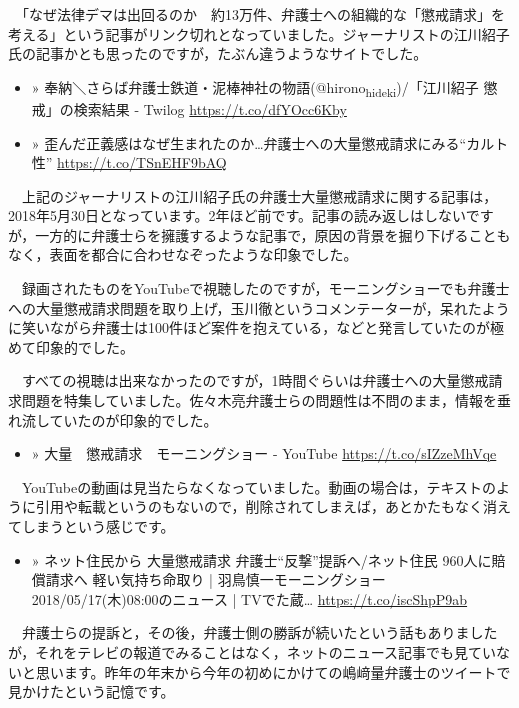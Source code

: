\documentclass[]{ltjarticle}
\begin{document}
　「なぜ法律デマは出回るのか　約13万件、弁護士への組織的な「懲戒請求」を考える」という記事がリンク切れとなっていました。ジャーナリストの江川紹子氏の記事かとも思ったのですが，たぶん違うようなサイトでした。

\begin{itemize}
\item » 奉納＼さらば弁護士鉄道・泥棒神社の物語(@hirono\textsubscript{hideki})/「江川紹子 懲戒」の検索結果 - Twilog \url{https://t.co/dfYOcc6Kby}

\item » 歪んだ正義感はなぜ生まれたのか…弁護士への大量懲戒請求にみる“カルト性” \url{https://t.co/TSnEHF9bAQ}
\end{itemize}

　上記のジャーナリストの江川紹子氏の弁護士大量懲戒請求に関する記事は，2018年5月30日となっています。2年ほど前です。記事の読み返しはしないですが，一方的に弁護士らを擁護するような記事で，原因の背景を掘り下げることもなく，表面を都合に合わせなぞったような印象でした。

　録画されたものをYouTubeで視聴したのですが，モーニングショーでも弁護士への大量懲戒請求問題を取り上げ，玉川徹というコメンテーターが，呆れたように笑いながら弁護士は100件ほど案件を抱えている，などと発言していたのが極めて印象的でした。

　すべての視聴は出来なかったのですが，1時間ぐらいは弁護士への大量懲戒請求問題を特集していました。佐々木亮弁護士らの問題性は不問のまま，情報を垂れ流していたのが印象的でした。

\begin{itemize}
\item » 大量　懲戒請求　モーニングショー - YouTube \url{https://t.co/sIZzeMhVqe}
\end{itemize}

　YouTubeの動画は見当たらなくなっていました。動画の場合は，テキストのように引用や転載というのもないので，削除されてしまえば，あとかたもなく消えてしまうという感じです。

\begin{itemize}
\item » ネット住民から 大量懲戒請求 弁護士“反撃”提訴へ/ネット住民 960人に賠償請求へ 軽い気持ち命取り | 羽鳥慎一モーニングショー 2018/05/17(木)08:00のニュース | TVでた蔵… \url{https://t.co/iscShpP9ab}
\end{itemize}

　弁護士らの提訴と，その後，弁護士側の勝訴が続いたという話もありましたが，それをテレビの報道でみることはなく，ネットのニュース記事でも見ていないと思います。昨年の年末から今年の初めにかけての嶋﨑量弁護士のツイートで見かけたという記憶です。
\end{document}
